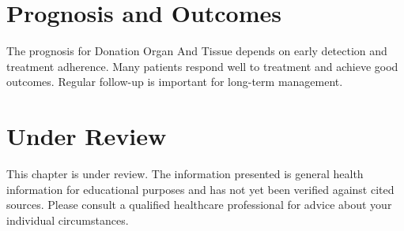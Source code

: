 \section*{Prognosis and Outcomes}
The prognosis for Donation Organ And Tissue depends on early detection and treatment adherence. Many patients respond well to treatment and achieve good outcomes. Regular follow-up is important for long-term management.
\section*{Under Review}
This chapter is under review. The information presented is general health information for educational purposes and has not yet been verified against cited sources. Please consult a qualified healthcare professional for advice about your individual circumstances.


\clearpage
